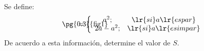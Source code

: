 Se define:
\[ \begin{minipage}{0.5cm}
\pg{0.3}{fig1}
\end{minipage} \hspace{0.2cm}= \left\{\begin{array}{cc}
a^2 ; & \lr{si }a \lr{ es par}  \\ 
2a-a^2 ; & \lr{si } a \lr{ es impar}
\end{array}\right.    \]
De acuerdo a esta información, determine el valor de $ S $.
\begin{center}
\end{center}
